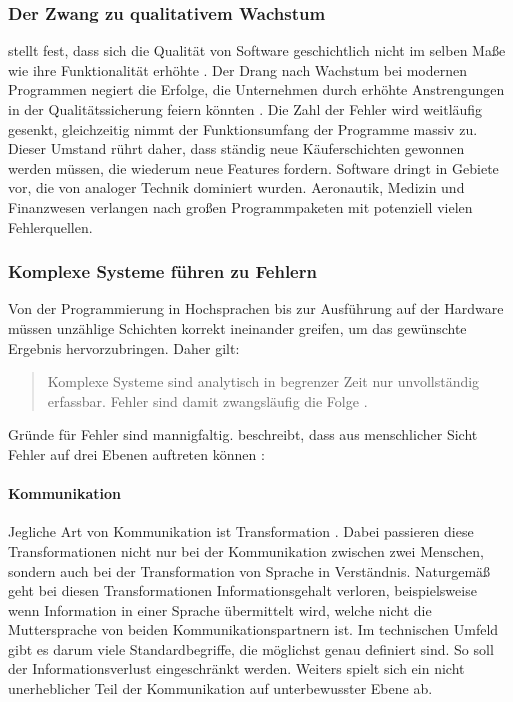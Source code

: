 \subsubsection{Der Zwang zu qualitativem Wachstum}
\citeauthor{hoffmann_software-qualitat_2013} stellt fest, dass sich die Qualität von Software geschichtlich nicht im selben Maße wie ihre Funktionalität erhöhte \cite{hoffmann_software-qualitat_2013}. Der Drang nach Wachstum bei modernen Programmen negiert die Erfolge, die Unternehmen durch erhöhte Anstrengungen in der Qualitätssicherung feiern könnten . Die Zahl der Fehler wird weitläufig gesenkt,  gleichzeitig nimmt der Funktionsumfang der Programme massiv zu. Dieser Umstand rührt daher, dass ständig neue Käuferschichten gewonnen werden müssen, die wiederum neue Features fordern.
Software dringt in Gebiete vor, die von analoger Technik dominiert wurden. Aeronautik, Medizin und Finanzwesen verlangen nach großen Programmpaketen mit potenziell vielen Fehlerquellen.

\subsubsection{Komplexe Systeme führen zu Fehlern}
Von der Programmierung in Hochsprachen bis zur Ausführung auf der Hardware müssen unzählige Schichten korrekt ineinander greifen, um das gewünschte Ergebnis hervorzubringen. 
Daher gilt:

\begin{quote}
Komplexe Systeme sind analytisch in begrenzer Zeit nur unvollständig erfassbar. Fehler sind damit zwangsläufig die Folge \cite{vigenschow_objektorientiertes_2004}.
\end{quote}

Gründe für Fehler sind mannigfaltig. \citeauthor{vigenschow_objektorientiertes_2004} beschreibt, dass aus menschlicher Sicht Fehler auf drei Ebenen auftreten können \cite{vigenschow_objektorientiertes_2004}:

\paragraph{Kommunikation}
Jegliche Art von Kommunikation ist Transformation \cite{shannon_mathematische_1976}. Dabei passieren diese Transformationen nicht nur bei der Kommunikation zwischen zwei Menschen, sondern auch bei der Transformation von Sprache in Verständnis. Naturgemäß geht bei diesen Transformationen Informationsgehalt verloren, beispielsweise wenn Information in einer Sprache übermittelt wird, welche nicht die Muttersprache von beiden Kommunikationspartnern ist.
Im technischen Umfeld gibt es darum viele Standardbegriffe, die möglichst genau definiert sind. So soll der Informationsverlust eingeschränkt werden.
Weiters spielt sich ein nicht unerheblicher Teil der Kommunikation auf unterbewusster Ebene ab.


